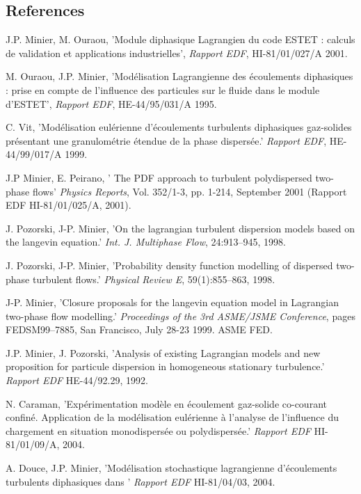 \subsection{References}

\begin{thebibliography}{3}


    J.P. Minier, M. Ouraou, 'Module diphasique Lagrangien
   du code ESTET : calculs de validation et applications industrielles',
   {\it Rapport EDF}, HI-81/01/027/A 2001.

    M. Ouraou, J.P. Minier, 'Mod\'elisation Lagrangienne des
   \'ecoulements diphasiques : prise en compte de l'influence des particules
   sur le fluide dans le module d'ESTET',
   {\it Rapport EDF}, HE-44/95/031/A 1995.

     C. Vit, 'Mod\'elisation eul\'erienne d'\'ecoulements
   turbulents diphasiques gaz-solides pr\'esentant une granulom\'etrie
   \'etendue de la phase dispers\'ee.'
   {\it Rapport EDF}, HE-44/99/017/A 1999.

    J.P Minier, E. Peirano,
   ' The PDF approach to turbulent polydispersed two-phase flows'
   {\it Physics Reports}, Vol. 352/1-3, pp. 1-214, September 2001
   (Rapport EDF HI-81/01/025/A, 2001).

    J. Pozorski, J-P. Minier,
   'On the lagrangian turbulent dispersion models based on the langevin
   equation.'
   {\it Int. J. Multiphase Flow}, 24:913--945, 1998.

    J. Pozorski, J-P. Minier,
   'Probability density function modelling of dispersed two-phase
   turbulent flows.'
   {\it Physical Review E}, 59(1):855--863, 1998.

    J-P. Minier,
   'Closure proposals for the langevin equation model in {L}agrangian
   two-phase flow modelling.'
   {\it Proceedings of the 3rd ASME/JSME Conference}, pages
   FEDSM99--7885, San Francisco, July 28-23 1999. ASME FED.

    J.P. Minier, J. Pozorski,
   'Analysis of existing Lagrangian models and new
   proposition for particule dispersion in
   homogeneous stationary turbulence.'
   {\it Rapport EDF} HE-44/92.29, 1992.

    N. Caraman,
   'Exp\'erimentation mod\`ele en \'ecoulement gaz-solide co-courant confin\'e.
   Application de la mod\'elisation eul\'erienne \`a l'analyse de l'influence
   du chargement en situation monodispers\'ee ou polydispers\'ee.'
   {\it Rapport EDF} HI-81/01/09/A, 2004.

    A. Douce, J.P. Minier,
   'Mod\'elisation stochastique lagrangienne d'\'ecoulements turbulents
   diphasiques dans \CS'
   {\it Rapport EDF} HI-81/04/03, 2004.

\end{thebibliography}

